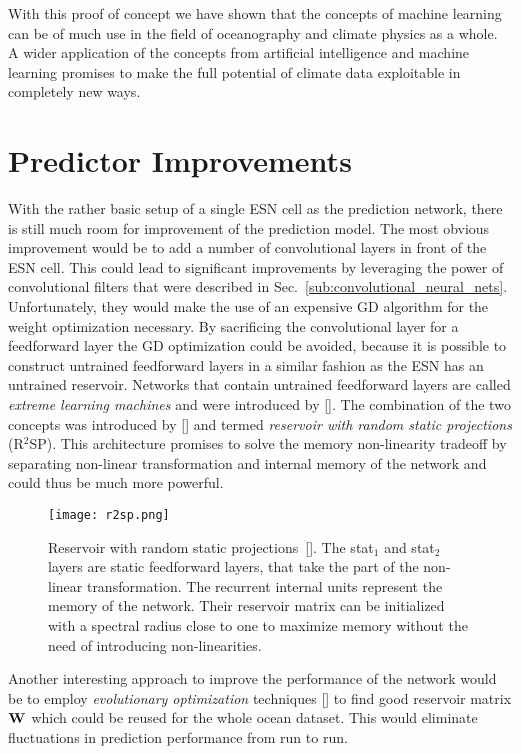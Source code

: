 With this proof of concept we have shown that the concepts of machine learning
can be of much use in the field of oceanography and climate physics as a whole.
A wider application of the concepts from artificial intelligence and machine
learning promises to make the full potential of climate data exploitable in
completely new ways.


\section{Predictor Improvements}
With the rather basic setup of a single ESN cell as the prediction network,
there is still much room for improvement of the prediction model.  The most
obvious improvement would be to add a number of  convolutional layers in front
of the ESN cell. This could lead to significant improvements by leveraging the
power of convolutional filters that were described in
Sec.~\ref{sub:convolutional_neural_nets}.  Unfortunately, they would make the
use of an expensive GD algorithm for the weight optimization necessary.
By sacrificing the convolutional layer for a feedforward layer the GD
optimization could be avoided, because it is possible to construct untrained
feedforward layers in a similar fashion as the ESN has an untrained reservoir.
Networks that contain untrained feedforward layers are called \emph{extreme
learning machines} and were introduced by [\cite{huang2006}].  The combination of
the two concepts was introduced by [\cite{butcher2013}] and termed
\emph{reservoir with random static projections} (R$^2$SP).  This architecture
promises to solve the memory non-linearity tradeoff by separating non-linear
transformation and internal memory of the network and could thus be much more
powerful.

\begin{figure}
  \centering
  \texttt{[image: r2sp.png]}
  \caption{Reservoir with random static projections~[\cite{butcher2013}]. The
  stat$_1$ and stat$_2$ layers are static feedforward layers, that take the
  part of the non-linear transformation.  The recurrent internal units
  represent the memory of the network. Their reservoir matrix can be
  initialized with a spectral radius close to one to maximize memory without
  the need of introducing non-linearities.}
  \label{fig:r2sp}
\end{figure}

Another interesting approach to improve the performance of the network would be
to employ \emph{evolutionary optimization} techniques [\cite{fogel1997}] to find
good reservoir matrix $\boldsymbol{\textbf{W}}^{\text{}}$ which could be reused for the whole ocean
dataset.  This would eliminate fluctuations in prediction performance from run
to run.


